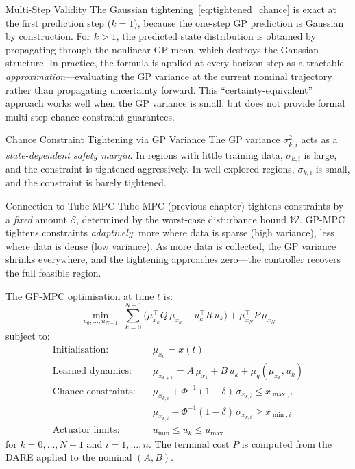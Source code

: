 \begin{alertbox}{Multi-Step Validity}
	The Gaussian tightening~\eqref{eq:tightened_chance} is exact at the first prediction step ($k=1$), because the one-step GP prediction is Gaussian by construction. For $k > 1$, the predicted state distribution is obtained by propagating through the nonlinear GP mean, which destroys the Gaussian structure. In practice, the formula is applied at every horizon step as a tractable \emph{approximation}---evaluating the GP variance at the current nominal trajectory rather than propagating uncertainty forward. This ``certainty-equivalent'' approach works well when the GP variance is small, but does not provide formal multi-step chance constraint guarantees.
\end{alertbox}

\begin{defnbox}{Chance Constraint Tightening via GP Variance}
	The GP variance $\sigma_{k,i}^2$ acts as a \emph{state-dependent safety margin}. In regions with little training data, $\sigma_{k,i}$ is large, and the constraint is tightened aggressively. In well-explored regions, $\sigma_{k,i}$ is small, and the constraint is barely tightened.
\end{defnbox}

\begin{notebox}{Connection to Tube MPC}
	Tube MPC (previous chapter) tightens constraints by a \emph{fixed} amount $\mathcal{E}$, determined by the worst-case disturbance bound $\mathcal{W}$. GP-MPC tightens constraints \emph{adaptively}: more where data is sparse (high variance), less where data is dense (low variance). As more data is collected, the GP variance shrinks everywhere, and the tightening approaches zero---the controller recovers the full feasible region.
\end{notebox}

The GP-MPC optimisation at time $t$ is:
\begin{equation*}
	\min_{u_0, \ldots, u_{N-1}} \; \sum_{k=0}^{N-1}\bigl(\mu_{x_k}^\top Q\,\mu_{x_k} + u_k^\top R\,u_k\bigr) + \mu_{x_N}^\top P\,\mu_{x_N}
\end{equation*}
subject to:
\begin{align*}
	\text{Initialisation:} \quad & \mu_{x_0} = x(t) \\
	\text{Learned dynamics:} \quad & \mu_{x_{k+1}} = A\,\mu_{x_k} + B\,u_k + \mu_g(\mu_{x_k}, u_k) \\
	\text{Chance constraints:} \quad & \mu_{x_{k,i}} + \Phi^{-1}(1-\delta)\,\sigma_{x_{k,i}} \le x_{\max,i} \\
	& \mu_{x_{k,i}} - \Phi^{-1}(1-\delta)\,\sigma_{x_{k,i}} \ge x_{\min,i} \\
	\text{Actuator limits:} \quad & u_{\min} \le u_k \le u_{\max}
\end{align*}
for $k = 0, \ldots, N-1$ and $i = 1, \ldots, n$. The terminal cost $P$ is computed from the DARE applied to the nominal $(A, B)$.



